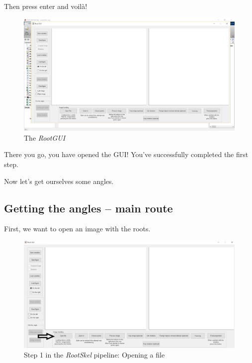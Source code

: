 Then press enter and voil\`a!
\begin{figure}[H]
	\centering
	\includegraphics[width=\textwidth]{../Figures/manual/intro3.jpg}
	\caption{The \textit{RootGUI}}
	\label{fig:img3}
\end{figure}

There you go, you have opened the GUI! You've successfully completed the first step.

Now let's get ourselves some angles.
\subsection{Getting the angles -- main route}

First, we want to open an image with the roots.
 \begin{figure}[H]
 	\centering
 	\includegraphics[width=\textwidth]{../Figures/manual/step1.jpg}
 	\caption{Step 1 in the \textit{RootSkel} pipeline: Opening a file}
 	\label{fig:img4}
 \end{figure}
 
